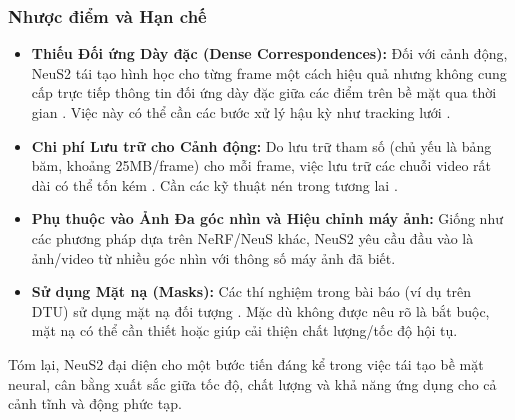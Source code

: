 \subsubsection{Nhược điểm và Hạn chế}
\begin{itemize}
    \item \textbf{Thiếu Đối ứng Dày đặc (Dense Correspondences):} Đối với cảnh động, NeuS2 tái tạo hình học cho từng frame một cách hiệu quả nhưng không cung cấp trực tiếp thông tin đối ứng dày đặc giữa các điểm trên bề mặt qua thời gian \cite{Wang2023NeuS2_source_221}. Việc này có thể cần các bước xử lý hậu kỳ như tracking lưới \cite{Wang2023NeuS2_source_222}.
    \item \textbf{Chi phí Lưu trữ cho Cảnh động:} Do lưu trữ tham số (chủ yếu là bảng băm, khoảng 25MB/frame) cho mỗi frame, việc lưu trữ các chuỗi video rất dài có thể tốn kém \cite{Wang2023NeuS2_source_232}. Cần các kỹ thuật nén trong tương lai \cite{Wang2023NeuS2_source_233}.
    \item \textbf{Phụ thuộc vào Ảnh Đa góc nhìn và Hiệu chỉnh máy ảnh:} Giống như các phương pháp dựa trên NeRF/NeuS khác, NeuS2 yêu cầu đầu vào là ảnh/video từ nhiều góc nhìn với thông số máy ảnh đã biết.
    \item \textbf{Sử dụng Mặt nạ (Masks):} Các thí nghiệm trong bài báo (ví dụ trên DTU) sử dụng mặt nạ đối tượng \cite{Wang2023NeuS2_source_167, Wang2023NeuS2_source_349}. Mặc dù không được nêu rõ là bắt buộc, mặt nạ có thể cần thiết hoặc giúp cải thiện chất lượng/tốc độ hội tụ.
\end{itemize}

Tóm lại, NeuS2 đại diện cho một bước tiến đáng kể trong việc tái tạo bề mặt neural, cân bằng xuất sắc giữa tốc độ, chất lượng và khả năng ứng dụng cho cả cảnh tĩnh và động phức tạp.